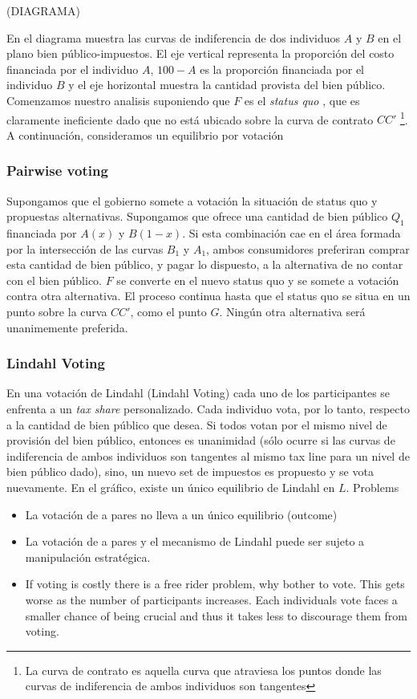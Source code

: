 (DIAGRAMA)
 
En el diagrama muestra las curvas de indiferencia de dos individuos $A$ y $B$ en el plano bien público-impuestos.
El eje vertical representa la proporción del costo financiada por el individuo $A$, $100-A$ es la proporción financiada por el individuo $B$ y el eje horizontal muestra la cantidad provista del bien público. Comenzamos nuestro analisis suponiendo que $F$ es el \textit{ status quo }, que es claramente ineficiente dado que no está ubicado sobre la curva de contrato $CC'$ \footnote{La curva de contrato es aquella curva que atraviesa los puntos donde las curvas de indiferencia de ambos individuos son tangentes}.
A continuación, consideramos un equilibrio por votación
\subsubsection{Pairwise voting}
Supongamos que el gobierno somete a votación la situación de status quo y propuestas alternativas. Supongamos que ofrece una cantidad de bien público $Q_1$ financiada por $A(x)$ y $B(1-x)$. Si esta combinación cae en el área formada por la intersección de las curvas $B_1$ y $A_1$, ambos consumidores preferiran comprar esta cantidad de bien público, y pagar lo dispuesto, a la alternativa de no contar con el bien público. $F$ se converte en el nuevo status quo y se somete a votación contra otra alternativa. El proceso continua hasta que el status quo se situa en un punto sobre la curva $CC'$, como el punto $G$. Ningún otra alternativa será unanimemente preferida.
\subsubsection{Lindahl Voting}
En una votación de Lindahl (Lindahl Voting) cada uno de los participantes se enfrenta a un \textit{tax share} personalizado. Cada individuo vota, por lo tanto, respecto a la cantidad de bien público que desea. Si todos votan por el mismo nivel de provisión del bien público, entonces es unanimidad (sólo ocurre si las curvas de indiferencia de ambos individuos son tangentes al mismo tax line para un nivel de bien público dado), sino, un nuevo set de impuestos es propuesto y se vota nuevamente. En el gráfico, existe un único equilibrio de Lindahl en $L$.
Problems
\begin{itemize}
 \item La votación de a pares no lleva a un único equilibrio (outcome)
 \item La votación de a pares y el mecanismo de Lindahl puede ser sujeto a manipulación estratégica.
 \item If voting is costly there is a free rider problem, why bother to vote. This gets worse as the number of participants increases. Each individuals vote faces a smaller chance of being crucial and thus it takes less to discourage them from voting.
\end{itemize}

